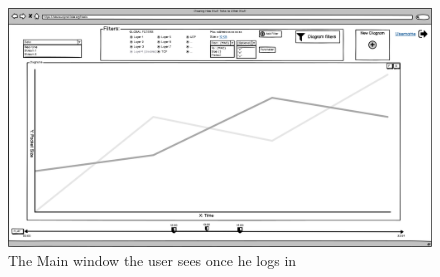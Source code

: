 \documentclass[twoside, english, draft]{Pflichtenheft}
\begin{document}
\begin{figure}[ht]
	\centering
	\includegraphics[width=\textwidth]{Images/02MW.png}
	\caption{The Main window the user sees once he logs in}
	\label{fig:mainWindow0}
\end{figure}
\vfill
\clearpage
\end{document}
